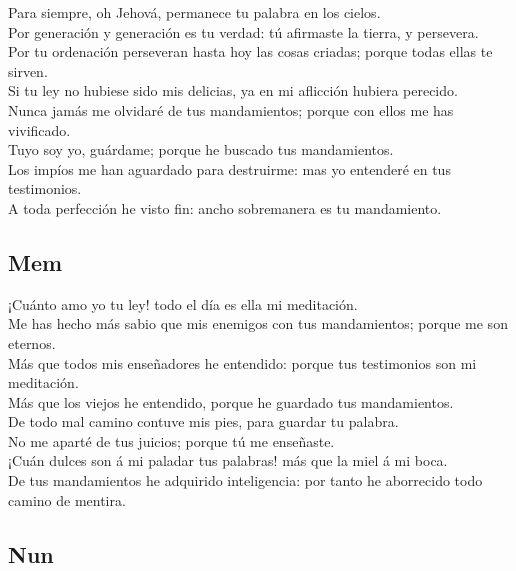  Para siempre, oh Jehová, permanece tu palabra en los
cielos.\\
 Por generación y generación es tu verdad: tú afirmaste la
tierra, y persevera.\\
 Por tu ordenación perseveran hasta hoy las cosas criadas;
porque todas ellas te sirven.\\
 Si tu ley no hubiese sido mis delicias, ya en mi aflicción
hubiera perecido.\\
 Nunca jamás me olvidaré de tus mandamientos; porque con
ellos me has vivificado.\\
 Tuyo soy yo, guárdame; porque he buscado tus
mandamientos.\\
 Los impíos me han aguardado para destruirme: mas yo
entenderé en tus testimonios.\\
 A toda perfección he visto fin: ancho sobremanera es tu
mandamiento.

\hypertarget{mem}{%
\subsection{Mem}\label{mem}}

 ¡Cuánto amo yo tu ley! todo el día es ella mi
meditación.\\
 Me has hecho más sabio que mis enemigos con tus
mandamientos; porque me son eternos.\\
 Más que todos mis enseñadores he entendido: porque tus
testimonios son mi meditación.\\
 Más que los viejos he entendido, porque he guardado tus
mandamientos.\\
 De todo mal camino contuve mis pies, para guardar tu
palabra.\\
 No me aparté de tus juicios; porque tú me enseñaste.\\
 ¡Cuán dulces son á mi paladar tus palabras! más que la
miel á mi boca.\\
 De tus mandamientos he adquirido inteligencia: por tanto
he aborrecido todo camino de mentira.

\hypertarget{nun}{%
\subsection{Nun}\label{nun}}

